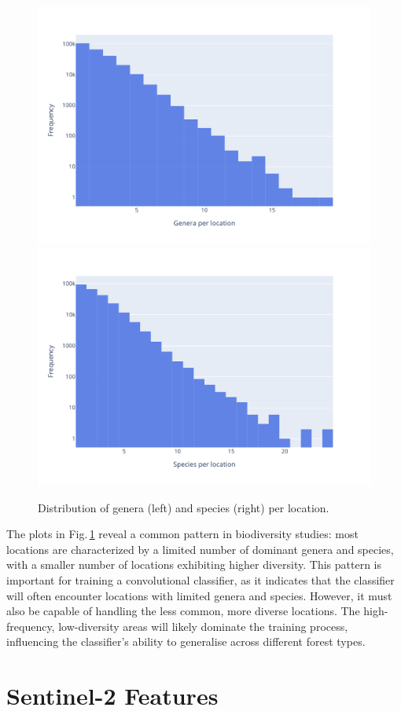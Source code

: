 \begin{figure}[!thb]
    \centering

    \includegraphics[width=0.48\linewidth, trim={0 0 2cm 0}]{figures/figures_labels/grouped_genus.pdf}%
    \includegraphics[width=0.48\linewidth, trim={0 0 2cm 0}]{figures/figures_labels/grouped_species.pdf}

    \caption{Distribution of genera (left) and species (right) per location.}
    \label{fig:grouped_histograms}
\end{figure}
 
The plots in Fig.\,\ref{fig:grouped_histograms} reveal a common pattern in biodiversity studies:
most locations are characterized by a limited number of dominant genera and species,
with a smaller number of locations exhibiting higher diversity.
This pattern is important for training a convolutional classifier, as it indicates that
the classifier will often encounter locations with limited genera and species.
However, it must also be capable of handling the less common, more diverse locations.
The high-frequency, low-diversity areas will likely dominate the training process, 
influencing the classifier's ability to generalise across different forest types.

\section{Sentinel-2 Features}

